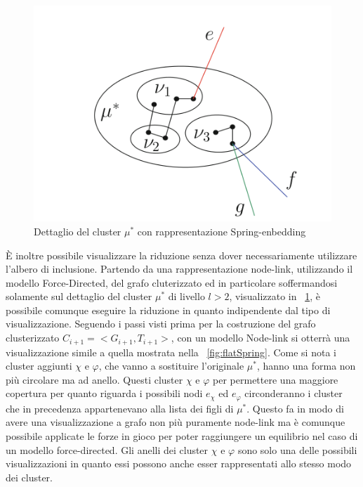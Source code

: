 {\begin{figure}[!htb]
	\begin{center}
		\includegraphics[width=1 \linewidth]{figure/dettaglioCluster}
	\end{center}
	\caption{Dettaglio del cluster $\mu^*$ con rappresentazione Spring-enbedding \label{fig:dettaglioCluster}}
\end{figure}
\newline
È inoltre possibile visualizzare la riduzione senza dover necessariamente utilizzare l'albero di inclusione. Partendo da una rappresentazione node-link, utilizzando il modello Force-Directed,  del grafo cluterizzato ed in particolare soffermandosi solamente sul dettaglio del cluster $\mu^*$ di livello $l>2$, visualizzato in \figurename~\ref{fig:dettaglioCluster}, è possibile comunque eseguire la riduzione in quanto indipendente dal tipo di visualizzazione. Seguendo i passi visti prima per la costruzione del grafo clusterizzato $C_{i+1} = <G_{i+1},T_{i+1}>$, con un modello Node-link si otterrà una visualizzazione simile a quella mostrata nella \figurename~\ref{fig:flatSpring}. Come si nota i cluster aggiunti $\chi$ e $\varphi$, che vanno a sostituire l'originale $\mu^*$, hanno una forma non più circolare ma ad anello. Questi cluster $\chi$ e $\varphi$ per permettere una maggiore copertura per quanto riguarda i possibili nodi $e_\chi$ ed $e_\varphi$ circonderanno i cluster che in precedenza appartenevano alla lista dei figli di $\mu^*$. Questo fa in modo di avere una visualizzazione a grafo non più puramente node-link ma è comunque possibile applicate le forze in gioco per poter raggiungere un equilibrio nel caso di un modello force-directed. Gli anelli dei cluster $\chi$ e $\varphi$ sono solo una delle possibili visualizzazioni in quanto essi possono anche esser rappresentati allo stesso modo dei cluster.
}
